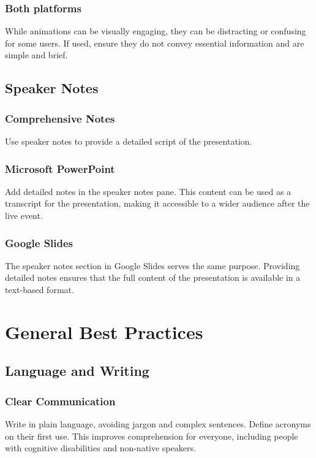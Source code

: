 \subsubsection{Both platforms}\label{ch15:sssec:animations-both}
While animations can be visually engaging, they can be distracting or confusing for some users. If used, ensure they do not convey essential information and are simple and brief.

\subsection{Speaker Notes}\label{ch15:ssec:speaker-notes}

\subsubsection{Comprehensive Notes}\label{ch15:sssec:comprehensive-notes}
Use speaker notes to provide a detailed script of the presentation.

\subsubsection{Microsoft PowerPoint}\label{ch15:sssec:ppt-speaker-notes}
Add detailed notes in the speaker notes pane. This content can be used as a transcript for the presentation, making it accessible to a wider audience after the live event.

\subsubsection{Google Slides}\label{ch15:sssec:slides-speaker-notes}
The speaker notes section in Google Slides serves the same purpose. Providing detailed notes ensures that the full content of the presentation is available in a text-based format.

\section{General Best Practices}\label{ch15:sec:general-best-practices}

\subsection{Language and Writing}\label{ch15:ssec:language-writing}

\subsubsection{Clear Communication}\label{ch15:sssec:clear-communication}
Write in plain language, avoiding jargon and complex sentences. Define acronyms on their first use. This improves comprehension for everyone, including people with cognitive disabilities and non-native speakers.

